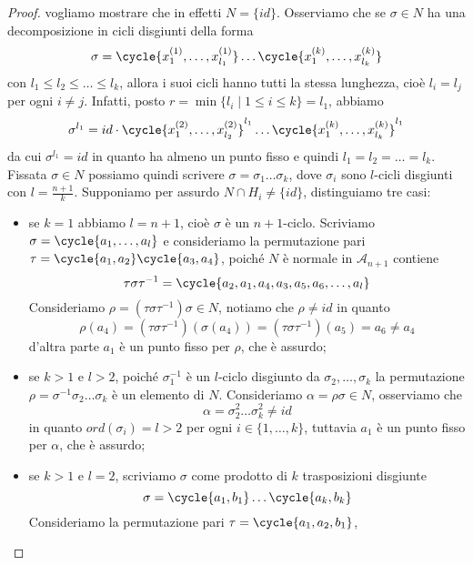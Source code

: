 \documentclass[11pt]{scrartcl}
\begin{document}
\begin{proof}
    vogliamo mostrare che in effetti $N = \{id\}$. Osserviamo che se
    $\sigma \in N$ ha una decomposizione in cicli disgiunti
    della forma
    \[
        \sigma = \cycle{x_1^{(1)}, \ldots, x_{l_1}^{(1)}}\ldots\cycle{x_1^{(k)}, \ldots, x_{l_k}^{(k)}}
    \]
    con $l_1\leqslant l_2\leqslant \ldots\leqslant l_k$, allora i suoi cicli 
    hanno tutti la stessa lunghezza, cioè $l_i = l_j$ per ogni $i \neq j$.
    Infatti, posto $r = \min\{l_i\mid 1\leqslant i \leqslant k\} = l_1$, 
    abbiamo
    \[
        \sigma^{l_1} = id \cdot \cycle{x_1^{(2)}, \ldots, x_{l_2}^{(2)}}^{l_1}
        \ldots\cycle{x_1^{(k)}, \ldots, x_{l_k}^{(k)}}^{l_1}
    \]
    da cui $\sigma^{l_1} = id$ in quanto ha almeno un punto fisso e quindi 
    $l_1 = l_2 = \ldots = l_k$. Fissata $\sigma \in N$ possiamo quindi scrivere
    $\sigma = \sigma_1\ldots\sigma_k$,
    dove $\sigma_i$ sono $l$-cicli disgiunti con $l = \displaystyle\frac{n + 1}{k}$.
    Supponiamo per assurdo $N\cap H_i \neq \{id\}$, distinguiamo tre casi:
    \begin{itemize}
        \item se $k = 1$ abbiamo $l = n + 1$, cioè $\sigma$ è un $n + 1$-ciclo.
        Scriviamo $\sigma = \cycle{a_1, \ldots, a_l}$ e consideriamo la permutazione
        pari $\tau = \cycle{a_1, a_2}\cycle{a_3, a_4}$, poiché $N$ è normale in 
        $\mathcal{A}_{n + 1}$ contiene
        \[
            \tau\sigma\tau^{-1} = \cycle{a_2, a_1, a_4, a_3, a_5, a_6, \ldots, a_l}
        \]
        Consideriamo $\rho = (\tau\sigma\tau^{-1})\sigma \in N$, notiamo che
        $\rho \neq id$ in quanto
        \[
            \rho(a_4) = (\tau\sigma\tau^{-1})(\sigma(a_4)) = (\tau\sigma\tau^{-1})(a_5) = 
            a_6 \neq a_4
        \]
        d'altra parte $a_1$ è un punto fisso per $\rho$, che è assurdo;
        \item se $k > 1$ e $l > 2$, poiché $\sigma_1^{-1}$ è un $l$-ciclo
        disgiunto da $\sigma_2, \ldots, \sigma_k$ la permutazione 
        $\rho = \sigma^{-1}\sigma_2\ldots\sigma_k$ è un elemento di $N$. 
        Consideriamo $\alpha = \rho\sigma \in N$, osserviamo che 
        \[
            \alpha = \sigma_2^2\ldots\sigma_k^2 \neq id
        \]
        in quanto $ord(\sigma_i) = l > 2$ per ogni $i \in \{1, \ldots, k\}$,
        tuttavia $a_1$ è un punto fisso per $\alpha$, che è assurdo;
        \item se $k > 1$ e $l = 2$, scriviamo $\sigma$ come prodotto di $k$
        trasposizioni disgiunte
        \[
            \sigma = \cycle{a_1, b_1}\ldots\cycle{a_k, b_k}
        \]
        Consideriamo la permutazione pari $\tau = \cycle{a_1, a_2, b_1}$,

\end{itemize}
\end{proof}
\end{document}
